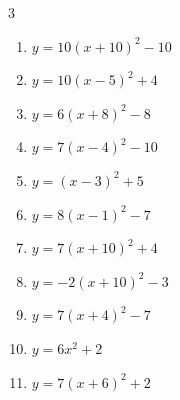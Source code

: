 \begin{multicols}{3}
\begin{enumerate}
        \phantom{$\displaystyle 頂点\left( -4 , -1 \right)$}

  \item $\displaystyle y=10\left( x+10\right)^{2}-10$

        \phantom{$\displaystyle 頂点\left( -10 , -10 \right)$}

  \item $\displaystyle y=10\left( x-5\right)^{2}+4$

        \phantom{$\displaystyle 頂点\left( 5 , 4 \right)$}

  \item $\displaystyle y=6\left( x+8\right)^{2}-8$

        \phantom{$\displaystyle 頂点\left( -8 , -8 \right)$}

  \item $\displaystyle y=7\left( x-4\right)^{2}-10$

        \phantom{$\displaystyle 頂点\left( 4 , -10 \right)$}

  \item $\displaystyle y=\left( x-3\right)^{2}+5$

        \phantom{$\displaystyle 頂点\left( 3 , 5 \right)$}

  \item $\displaystyle y=8\left( x-1\right)^{2}-7$

        \phantom{$\displaystyle 頂点\left( 1 , -7 \right)$}

  \item $\displaystyle y=7\left( x+10\right)^{2}+4$

        \phantom{$\displaystyle 頂点\left( -10 , 4 \right)$}

  \item $\displaystyle y=-2\left( x+10\right)^{2}-3$

        \phantom{$\displaystyle 頂点\left( -10 , -3 \right)$}

  \item $\displaystyle y=7\left( x+4\right)^{2}-7$

        \phantom{$\displaystyle 頂点\left( -4 , -7 \right)$}

  \item $\displaystyle y=6x^{2}+2$

        \phantom{$\displaystyle 頂点\left( 0 , 2 \right)$}

  \item $\displaystyle y=7\left( x+6\right)^{2}+2$

        \phantom{$\displaystyle 頂点\left( -6 , 2 \right)$}


\end{enumerate}
\end{multicols}
